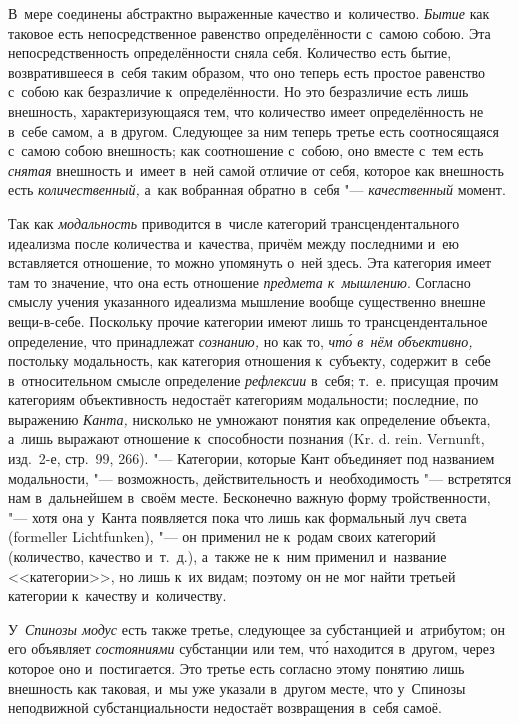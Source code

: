 В~мере соединены абстрактно выраженные качество и~количество. {\em Бытие} как
таковое есть непосредственное равенство определённости с~самою собою. Эта
непосредственность определённости сняла себя. Количество есть бытие,
возвратившееся в~себя таким образом, что оно теперь есть простое равенство
с~собою как безразличие к~определённости. Но это безразличие есть лишь
внешность, характеризующаяся тем, что количество имеет определённость не в~себе
самом, а~в другом. Следующее за ним теперь третье есть соотносящаяся с~самою
собою внешность; как соотношение с~собою, оно вместе с~тем есть {\em снятая}
внешность и~имеет в~ней самой отличие от себя, которое как внешность есть
{\em количественный,} а~как вобранная обратно в~себя "--- {\em качественный}
момент.

Так как {\em модальность} приводится в~числе категорий трансцендентального
идеализма после количества и~качества, причём между последними и~ею вставляется
отношение, то можно упомянуть о~ней здесь. Эта категория имеет там то значение,
что она есть отношение {\em предмета к~мышлению}. Согласно смыслу учения
указанного идеализма мышление вообще существенно внешне вещи-в-себе. Поскольку
прочие категории имеют лишь то трансцендентальное определение, что принадлежат
{\em сознанию,} но как то, {\em чт\'{о} в~нём объективно,} постольку
модальность, как категория отношения к~субъекту, содержит в~себе
в~относительном смысле определение {\em рефлексии} в~себя; т.~е. присущая
прочим категориям объективность недостаёт категориям модальности; последние, по
выражению {\em Канта,} нисколько не умножают понятия как определение объекта,
а~лишь выражают отношение к~способности познания (Kr. d. rein. Vernunft,
изд.~2-е, стр.~99, 266). "--- Категории, которые Кант объединяет под названием
модальности, "--- возможность, действительность и~необходимость "--- встретятся
нам в~дальнейшем в~своём месте. Бесконечно важную форму тройственности, "---
хотя она у~Канта появляется пока что лишь как формальный луч света (formeller
Lichtfunken), "--- он применил не к~родам своих категорий (количество, качество
и~т.~д.), а~также не к~ним применил и~название <<категории>>, но лишь к~их
видам; поэтому он не мог найти третьей категории к~качеству и~количеству.

У~{\em Спинозы модус} есть также третье, следующее за субстанцией и~атрибутом;
он его объявляет {\em состояниями} субстанции или тем, чт\'{о} находится
в~другом, через которое оно и~постигается. Это третье есть согласно этому
понятию лишь внешность как таковая, и~мы уже указали в~другом месте, что
у~Спинозы неподвижной субстанциальности недостаёт возвращения в~себя самоё.

